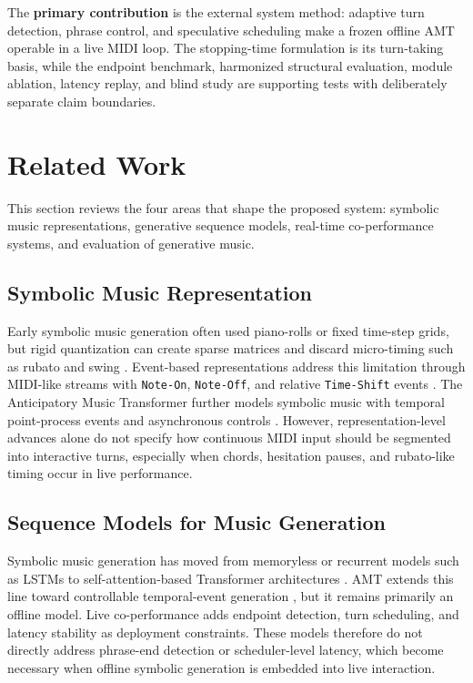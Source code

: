 \documentclass[11pt,a4paper]{article}
\begin{document}
The \textbf{primary contribution} is the external system method: adaptive turn detection, phrase control, and speculative scheduling make a frozen offline AMT operable in a live MIDI loop. The stopping-time formulation is its turn-taking basis, while the endpoint benchmark, harmonized structural evaluation, module ablation, latency replay, and blind study are supporting tests with deliberately separate claim boundaries.


\section{Related Work}
\label{sec:related-work}

This section reviews the four areas that shape the proposed system: symbolic music representations, generative sequence models, real-time co-performance systems, and evaluation of generative music.

\subsection{Symbolic Music Representation}


Early symbolic music generation often used piano-rolls or fixed time-step grids, but rigid quantization can create sparse matrices and discard micro-timing such as rubato and swing \citep{boulanger2012modeling}. Event-based representations address this limitation through MIDI-like streams with \verb|Note-On|, \verb|Note-Off|, and relative \verb|Time-Shift| events \citep{oore2020feeling,huang2018musictransformer}. The Anticipatory Music Transformer further models symbolic music with temporal point-process events and asynchronous controls \citep{thickstun2023amt}. However, representation-level advances alone do not specify how continuous MIDI input should be segmented into interactive turns, especially when chords, hesitation pauses, and rubato-like timing occur in live performance.

\subsection{Sequence Models for Music Generation}

Symbolic music generation has moved from memoryless or recurrent models such as LSTMs \citep{eck2002finding} to self-attention-based Transformer architectures \citep{vaswani2017attention,huang2018musictransformer}. AMT extends this line toward controllable temporal-event generation \citep{thickstun2023amt}, but it remains primarily an offline model. Live co-performance adds endpoint detection, turn scheduling, and latency stability as deployment constraints. These models therefore do not directly address phrase-end detection or scheduler-level latency, which become necessary when offline symbolic generation is embedded into live interaction.
\end{document}
